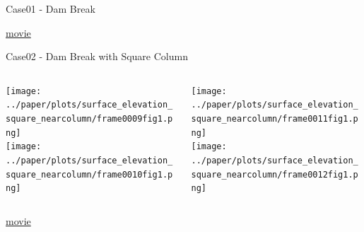 \documentclass[xcolor=dvipsnames]{beamer}
\begin{document}
\begin{frame}[label=sec-5-2]{Case01 - Dam Break}
\begin{block}{}
\href{../paper/plots/animation/cross_section_nocolumn.mp4}{movie}
\end{block}
\end{frame}

\begin{frame}[label=sec-5-3]{Case02 - Dam Break with Square Column}
\begin{columns}
\begin{column}{0.5\textwidth}
\begin{block}{}
\texttt{[image: ../paper/plots/surface\_elevation\_square\_nearcolumn/frame0009fig1.png]}\\
    \texttt{[image: ../paper/plots/surface\_elevation\_square\_nearcolumn/frame0010fig1.png]}\\
\end{block}
\end{column}

\begin{column}{0.5\textwidth}
\begin{block}{}
\texttt{[image: ../paper/plots/surface\_elevation\_square\_nearcolumn/frame0011fig1.png]}\\
    \texttt{[image: ../paper/plots/surface\_elevation\_square\_nearcolumn/frame0012fig1.png]}\\
\end{block}
\end{column}
\end{columns}

\begin{block}{}
\href{../paper/plots/animation/surface_elevation_square_nearcolumn.mp4}{movie}
\end{block}
\end{frame}
\end{document}
